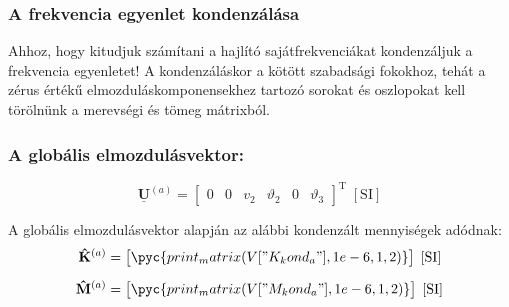 \documentclass[12pt,a4paper]{article}
\def\mx#1{\mathbf{#1}}
\def\vec#1{\underline{\mathbf{#1}}}
\def\ui#1{\left(#1\right)}
\def\SI{\; \left[\mathrm{SI}\right]}
\begin{document}
\subsubsection{A frekvencia egyenlet kondenzálása}
Ahhoz, hogy kitudjuk számítani a hajlító sajátfrekvenciákat kondenzáljuk a frekvencia egyenletet!
A kondenzáláskor a kötött szabadsági fokokhoz, tehát a zérus értékű elmozduláskomponensekhez tartozó sorokat és oszlopokat kell törölnünk a merevségi és tömeg mátrixból.
\subsubsection*{A globális elmozdulásvektor:}
\begin{equation*}
    \vec{U}^{\ui{a}}=
    \begin{bmatrix}
        0 & 0 & v_2 & \vartheta_2 & 0 & \vartheta_3
    \end{bmatrix}^{\mathrm{T}} \SI
\end{equation*}

\noindent A globális elmozdulásvektor alapján az alábbi kondenzált mennyiségek adódnak:
\begin{align*}
    \mx{\hat{K}}^{\ui{a}} & =
    \begin{bmatrix}
        \pyc{print_matrix(V["K_kond_a"],1e-6,1,2)}
    \end{bmatrix} \SI \\[2mm]
    \mx{\hat{M}}^{\ui{a}} & =
    \begin{bmatrix}
        \pyc{print_matrix(V["M_kond_a"],1e-6,1,2)}
    \end{bmatrix} \SI
\end{align*}
\end{document}
